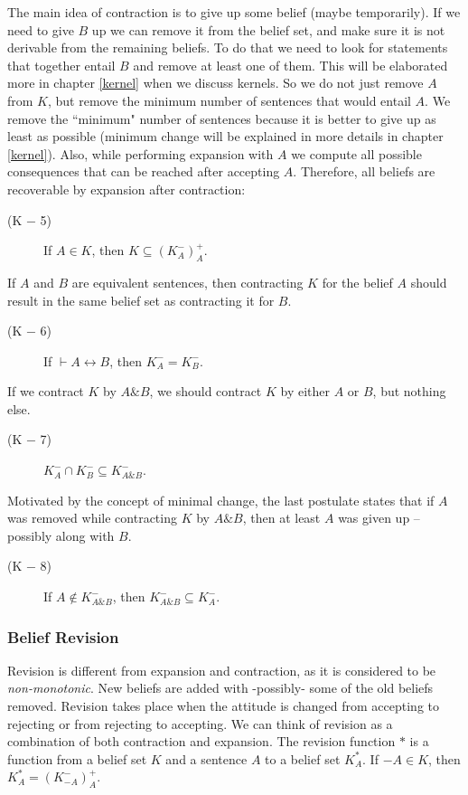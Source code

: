 The main idea of contraction is to give up some belief (maybe temporarily). If we need to give $B$ up we can remove it from the belief set, and make sure it is not derivable from the remaining beliefs. To do that we need to look for statements that together entail $B$ and remove at least one of them. This will be elaborated more in chapter \ref{kernel} when we discuss kernels. So we do not just remove $A$ from $K$, but remove the minimum number of sentences that would entail $A$. We remove the ``minimum" number of sentences because it is better to give up as least as possible (minimum change will be explained in more details in chapter \ref{kernel}). Also, while performing expansion with $A$ we compute all possible consequences that can be reached after accepting $A$. Therefore, all beliefs are recoverable by expansion after contraction:
\begin{description}
\item[(K $-$ 5)] If $A \in K$, then $K \subseteq (K^{-}_{A})^{+}_{A}$.
\end{description}
If $A$ and $B$ are equivalent sentences, then contracting $K$ for the belief $A$ should result in the same belief set as contracting it for $B$.
\begin{description}
\item[(K $-$ 6)] If $\vdash A \leftrightarrow B$, then $K^{-}_{A} = K^{-}_{B}$.
\end{description}
If we contract $K$ by $A \& B$, we should contract $K$ by either $A$ or $B$, but nothing else.
\begin{description}
\item[(K $-$ 7)] $K^{-}_{A} \cap K^{-}_{B} \subseteq K^{-}_{A \& B}$.
\end{description}
Motivated by the concept of minimal change, the last postulate states that if $A$ was removed while contracting $K$ by $A \& B$, then at least $A$ was given up -- possibly along with $B$.
\begin{description}
\item[(K $-$ 8)] If $A \notin K^{-}_{A \& B}$, then $K^{-}_{A \& B} \subseteq K^{-}_{A}$.
\end{description}

\subsubsection{Belief Revision}
Revision is different from expansion and contraction, as it is considered to be \textit{non-monotonic}. New beliefs are added with -possibly- some of the old beliefs removed. Revision takes place when the attitude is changed from accepting to rejecting or from rejecting to accepting. We can think of revision as a combination of both contraction and expansion. The revision function $*$ is a function from a belief set $K$ and a sentence $A$ to a belief set $K^{*}_{A}$. If $-A \in K$, then $K^{*}_{A} = (K^{-}_{-A})^{+}_{A}$.

